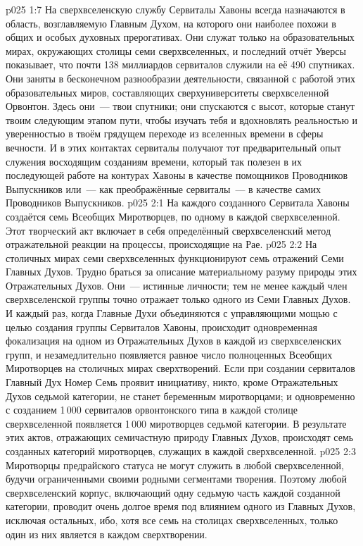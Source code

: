 \vs p025 1:7 На сверхвселенскую службу Сервиталы Хавоны всегда назначаются в область, возглавляемую Главным Духом, на которого они наиболее похожи в общих и особых духовных прерогативах. Они служат только на образовательных мирах, окружающих столицы семи сверхвселенных, и последний отчёт Уверсы показывает, что почти 138 миллиардов сервиталов служили на её 490 спутниках. Они заняты в бесконечном разнообразии деятельности, связанной с работой этих образовательных миров, составляющих сверхуниверситеты сверхвселенной Орвонтон. Здесь они~--- твои спутники; они спускаются с высот, которые станут твоим следующим этапом пути, чтобы изучать тебя и вдохновлять реальностью и уверенностью в твоём грядущем переходе из вселенных времени в сферы вечности. И в этих контактах сервиталы получают тот предварительный опыт служения восходящим созданиям времени, который так полезен в их последующей работе на контурах Хавоны в качестве помощников Проводников Выпускников или~--- как преображённые сервиталы~--- в качестве самих Проводников Выпускников.
\vs p025 2:1 На каждого созданного Сервитала Хавоны создаётся семь Всеобщих Миротворцев, по одному в каждой сверхвселенной. Этот творческий акт включает в себя определённый сверхвселенский метод отражательной реакции на процессы, происходящие на Рае.
\vs p025 2:2 На столичных мирах семи сверхвселенных функционируют семь отражений Семи Главных Духов. Трудно браться за описание материальному разуму природы этих Отражательных Духов. Они~--- истинные личности; тем не менее каждый член сверхвселенской группы точно отражает только одного из Семи Главных Духов. И каждый раз, когда Главные Духи объединяются с управляющими мощью с целью создания группы Сервиталов Хавоны, происходит одновременная фокализация на одном из Отражательных Духов в каждой из сверхвселенских групп, и незамедлительно появляется равное число полноценных Всеобщих Миротворцев на столичных мирах сверхтворений. Если при создании сервиталов Главный Дух Номер Семь проявит инициативу, никто, кроме Отражательных Духов седьмой категории, не станет беременным миротворцами; и одновременно с созданием 1\,000 сервиталов орвонтонского типа в каждой столице сверхвселенной появляется 1\,000 миротворцев седьмой категории. В результате этих актов, отражающих семичастную природу Главных Духов, происходят семь созданных категорий миротворцев, служащих в каждой сверхвселенной.
\vs p025 2:3 Миротворцы предрайского статуса не могут служить в любой сверхвселенной, будучи ограниченными своими родными сегментами творения. Поэтому любой сверхвселенский корпус, включающий одну седьмую часть каждой созданной категории, проводит очень долгое время под влиянием одного из Главных Духов, исключая остальных, ибо, хотя все семь  на столицах сверхвселенных, только один из них является  в каждом сверхтворении.
